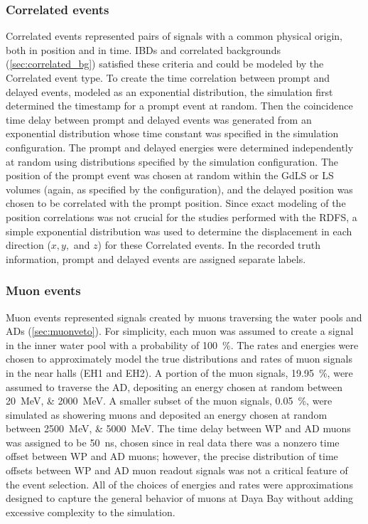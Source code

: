 \subsubsection{Correlated events}

Correlated events represented pairs of signals
with a common physical origin, both in position and in time.
IBDs and correlated backgrounds (\cref{sec:correlated_bg})
satisfied these criteria and could be modeled by the Correlated event type.
To create the time correlation between prompt and delayed events,
modeled as an exponential distribution,
the simulation first determined the timestamp for a prompt event at random.
Then the coincidence time delay between prompt and delayed events was generated
from an exponential distribution
whose time constant was specified in the simulation configuration.
The prompt and delayed energies were determined independently at random
using distributions specified by the simulation configuration.
The position of the prompt event was chosen at random
within the GdLS or LS volumes (again, as specified by the configuration),
and the delayed position was chosen to be correlated with the prompt position.
Since exact modeling of the position correlations was not crucial for the studies
performed with the RDFS,
a simple exponential distribution was used to determine the displacement
in each direction ($x,y,$ and $z$) for these Correlated events.
In the recorded truth information,
prompt and delayed events are assigned separate labels.

\subsubsection{Muon events}

Muon events represented signals created by muons traversing
the water pools and ADs (\cref{sec:muonveto}).
For simplicity, each muon was assumed to create a signal
in the inner water pool with a probability of \SI{100}{\percent}.
The rates and energies were chosen to approximately model
the true distributions and rates of muon signals in the near halls (EH1 and EH2).
A portion of the muon signals, \SI{19.95}{\percent},
were assumed to traverse the AD, depositing an energy chosen at random between
\SIlist{20;2000}{\MeV}.
A smaller subset of the muon signals, \SI{0.05}{\percent},
were simulated as showering muons and deposited an energy chosen at random between
\SIlist{2500;5000}{\MeV}.
The time delay between WP and AD muons was assigned to be \SI{50}{\ns},
chosen since in real data there was a nonzero time offset between WP and AD muons;
however, the precise distribution of time offsets between WP and AD muon readout signals
was not a critical feature of the event selection.
All of the choices of energies and rates were approximations
designed to capture the general behavior of muons at Daya Bay
without adding excessive complexity to the simulation.

